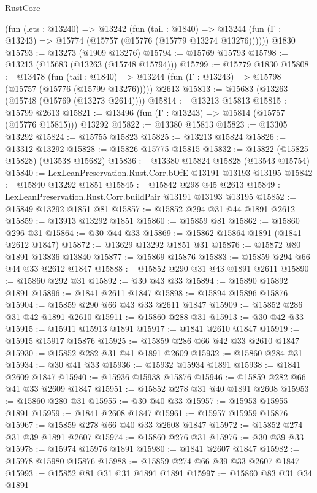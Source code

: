 \begin{lexlean}{RustCore}
\begin{coremodule}
    (fun (lets : @13240) =>
    @13242
      (fun (tail : @1840) =>
      @13244 (fun (Γ : @13243) => @15774 (@15757 (@15776 (@15779 @13274 @13276))))))
    @1830
@15793 := @13273 (@1909 @13276)
@15794 := @15769 @15793
@15798 := @13213 (@15683 (@13263 (@15748 @15794)))
@15799 := @15779 @1830
@15808 := @13478
    (fun (tail : @1840) => @13244 (fun (Γ : @13243) => @15798 (@15757 (@15776 (@15799 @13276)))))
    @2613
@15813 := @15683 (@13263 (@15748 (@15769 (@13273 @2614))))
@15814 := @13213 @15813
@15815 := @15799 @2613
@15821 := @13496 (fun (Γ : @13243) => @15814 (@15757 (@15776 @15815))) @13292
@15822 := @13380 @15813
@15823 := @13305 @13292
@15824 := @15755 @15823
@15825 := @13213 @15824
@15826 := @13312 @13292
@15828 := @15826 @15775 @15815
@15832 := @15822 (@15825 @15828) (@13538 @15682)
@15836 := @13380 @15824 @15828 (@13543 @15754)
@15840 := LexLeanPreservation.Rust.Corr.bOfE @13191 @13193 @13195
@15842 := @15840 @13292 @1851
@15845 := @15842 @298 @45 @2613
@15849 := LexLeanPreservation.Rust.Corr.buildPair @13191 @13193 @13195
@15852 := @15849 @13292 @1851 @81
@15857 := @15852 @294 @31 @44 @1891 @2612
@15859 := @13913 @13292 @1851
@15860 := @15859 @81
@15862 := @15860 @296 @31
@15864 := @30 @44 @33
@15869 := @15862 @15864 @1891 (@1841 @2612 @1847)
@15872 := @13629 @13292 @1851 @31
@15876 := @15872 @80 @1891 @13836 @13840
@15877 := @15869 @15876
@15883 := @15859 @294 @66 @44 @33 @2612 @1847
@15888 := @15852 @290 @31 @43 @1891 @2611
@15890 := @15860 @292 @31
@15892 := @30 @43 @33
@15894 := @15890 @15892 @1891
@15896 := @1841 @2611 @1847
@15898 := @15894 @15896 @15876
@15904 := @15859 @290 @66 @43 @33 @2611 @1847
@15909 := @15852 @286 @31 @42 @1891 @2610
@15911 := @15860 @288 @31
@15913 := @30 @42 @33
@15915 := @15911 @15913 @1891
@15917 := @1841 @2610 @1847
@15919 := @15915 @15917 @15876
@15925 := @15859 @286 @66 @42 @33 @2610 @1847
@15930 := @15852 @282 @31 @41 @1891 @2609
@15932 := @15860 @284 @31
@15934 := @30 @41 @33
@15936 := @15932 @15934 @1891
@15938 := @1841 @2609 @1847
@15940 := @15936 @15938 @15876
@15946 := @15859 @282 @66 @41 @33 @2609 @1847
@15951 := @15852 @278 @31 @40 @1891 @2608
@15953 := @15860 @280 @31
@15955 := @30 @40 @33
@15957 := @15953 @15955 @1891
@15959 := @1841 @2608 @1847
@15961 := @15957 @15959 @15876
@15967 := @15859 @278 @66 @40 @33 @2608 @1847
@15972 := @15852 @274 @31 @39 @1891 @2607
@15974 := @15860 @276 @31
@15976 := @30 @39 @33
@15978 := @15974 @15976 @1891
@15980 := @1841 @2607 @1847
@15982 := @15978 @15980 @15876
@15988 := @15859 @274 @66 @39 @33 @2607 @1847
@15993 := @15852 @81 @31 @31 @1891 @1891
@15997 := @15860 @83 @31 @34 @1891

\end{coremodule}
\end{lexlean}
